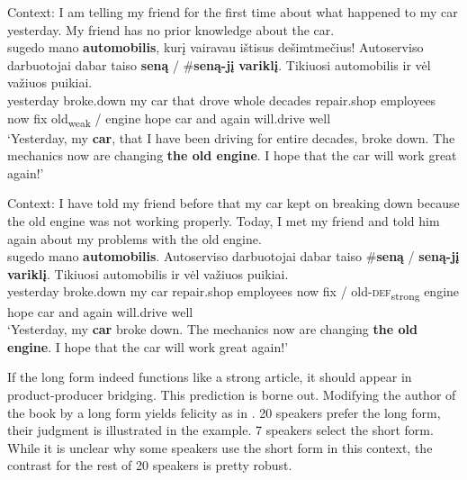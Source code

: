 \documentclass[output=paper,
modfonts
]{langscibook}
\begin{document}
\begin{exe}
	\ex \label{ex:sereikaite:54}
	Context: I am telling my friend for the first time about what happened to my car yesterday. My friend has no prior knowledge about the car. \\
	 {sugedo} {mano} {\textbf{automobilis}}, {kurį} {vairavau} {ištisus} {dešimtmečius}! {Autoserviso} {darbuotojai} {dabar} {taiso} \textbf{seną} \textnormal{/} \textnormal{\#}\textbf{seną-jį} {\textbf{variklį}}. {Tikiuosi} {automobilis} {ir} {vėl} {važiuos} {puikiai}.\\
	yesterday broke.down my {car} that drove whole decades repair.shop employees now fix {old\textsubscript{weak}} /  {engine} hope car and again will.drive well \\
	\trans `Yesterday, my \textbf{car}, that I have been driving for entire decades, broke down. The mechanics now are changing \textbf{the old engine}. I hope that the car will work great again!' 
\end{exe} \newpage

\begin{exe}
	\ex \label{ex:sereikaite:55}
	Context: I have told my friend before that my car kept on breaking down because the old engine was not working properly. Today, I met my friend and told him again about my problems with the old engine. \\ 
	 {sugedo} {mano} {\textbf{automobilis}}. {Autoserviso} {darbuotojai} {dabar} {taiso} \textnormal{\#}\textbf{seną} \textnormal{/} \textbf{seną-jį} {\textbf{variklį}}. {Tikiuosi} {automobilis} {ir} {vėl} {važiuos} {puikiai}.\\
	yesterday broke.down my {car} repair.shop employees now fix  / {old-\textsc{def}\textsubscript{strong}} engine hope car and again will.drive well \\ 
	\trans `Yesterday, my \textbf{car} broke down. The mechanics now are changing \textbf{the old engine}. I hope that the car will work great again!' \largerpage
\end{exe} 


If the long form indeed functions like a strong article, it should appear in product-producer bridging. This prediction is borne out. Modifying the author of the book by a long form yields felicity as in . 20 speakers prefer the long form, their judgment is illustrated in the example. 7 speakers select the short form. While it is unclear why some speakers use the short form in this context, the contrast for the rest of 20 speakers is pretty robust. 
\end{document}
